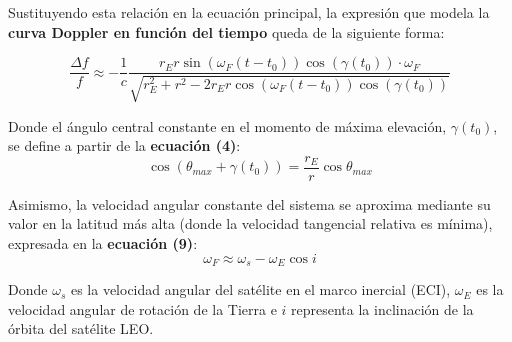 Sustituyendo esta relación en la ecuación principal, la expresión que modela la \textbf{curva Doppler en función del tiempo} queda de la siguiente forma:

\begin{equation}
\frac{\Delta f}{f} \approx -\frac{1}{c}\frac{r_{E}r \sin(\omega_{F}(t-t_{0}))\cos(\gamma(t_{0}))\cdot\omega_{F}}{\sqrt{r_{E}^{2}+r^{2}-2r_{E}r \cos(\omega_{F}(t-t_{0}))\cos(\gamma(t_{0}))}}
\end{equation}

Donde el ángulo central constante en el momento de máxima elevación, $\gamma(t_{0})$, se define a partir de la \textbf{ecuación (4)}:
\begin{equation}
\cos(\theta_{max}+\gamma(t_{0}))=\frac{r_{E}}{r}\cos \theta_{max}
\end{equation}

Asimismo, la velocidad angular constante del sistema se aproxima mediante su valor en la latitud más alta (donde la velocidad tangencial relativa es mínima), expresada en la \textbf{ecuación (9)}:
\begin{equation}
\omega_{F} \approx \omega_{s} - \omega_{E}\cos i
\end{equation}

Donde $\omega_{s}$ es la velocidad angular del satélite en el marco inercial (ECI), $\omega_{E}$ es la velocidad angular de rotación de la Tierra e $i$ representa la inclinación de la órbita del satélite LEO.



